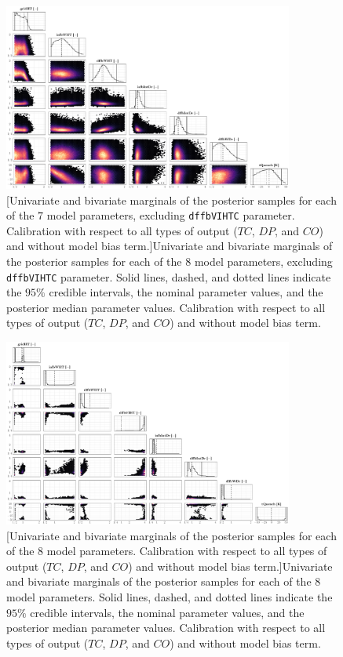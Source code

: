 \clearpage
\begin{figure}
	\centering
	\includegraphics[width=0.85\textwidth]{../figures/chapter5/figures/plotEnsAllDiscCenteredNoParam8}
		[Univariate and bivariate marginals of the posterior samples for each of the $7$ model parameters, excluding \texttt{dffbVIHTC} parameter. Calibration with respect to all types of output ($TC$, $DP$, and $CO$) and without model bias term.]{Univariate and bivariate marginals of the posterior samples for each of the $8$ model parameters, excluding \texttt{dffbVIHTC} parameter. Solid lines, dashed, and dotted lines indicate the $95\%$ credible intervals, the nominal parameter values, and the posterior median parameter values. Calibration with respect to all types of output ($TC$, $DP$, and $CO$) and without model bias term.}
	\label{fig:ch5_plot_ens_all_disc_centered_noparam8}
\end{figure}

\clearpage
\begin{figure}
	\centering
	\includegraphics[width=0.85\textwidth]{../figures/chapter5/figures/plotEnsAllNoDiscNoBC}
		[Univariate and bivariate marginals of the posterior samples for each of the $8$ model parameters. Calibration with respect to all types of output ($TC$, $DP$, and $CO$) and without model bias term.]{Univariate and bivariate marginals of the posterior samples for each of the $8$ model parameters. Solid lines, dashed, and dotted lines indicate the $95\%$ credible intervals, the nominal parameter values, and the posterior median parameter values. Calibration with respect to all types of output ($TC$, $DP$, and $CO$) and without model bias term.}
	\label{fig:ch5_plot_ens_all_nodisc}
\end{figure}
\clearpage